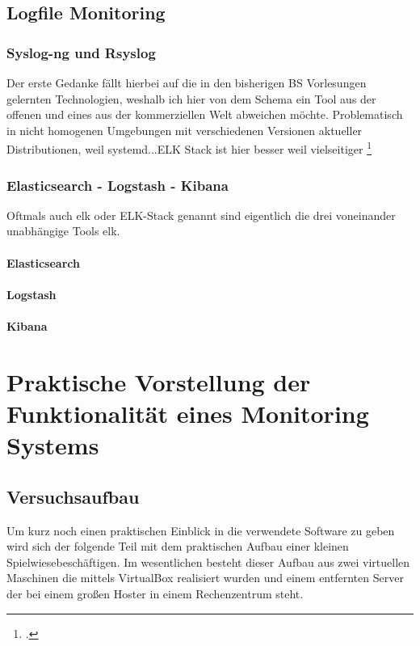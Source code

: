\documentclass[12pt,a4paper,parskip]{scrreprt}
\begin{document}
	\section{Logfile Monitoring}
	\subsection{Syslog-ng und Rsyslog}
	Der erste Gedanke fällt hierbei auf die in den bisherigen BS Vorlesungen gelernten Technologien, weshalb ich hier von dem Schema ein Tool aus der offenen und eines aus der kommerziellen Welt abweichen möchte.
	Problematisch in nicht homogenen Umgebungen mit verschiedenen Versionen aktueller Distributionen, weil systemd...ELK Stack ist hier besser weil vielseitiger
	\footcite{systemd2015}
	\subsection{Elasticsearch - Logstash - Kibana}
	Oftmals auch \acrshort{elk} oder ELK-Stack genannt sind eigentlich die drei voneinander unabhängige Tools \acrlong{elk}.
	\subsubsection{Elasticsearch}
	\subsubsection{Logstash}
	\subsubsection{Kibana}
	\chapter{Praktische Vorstellung der Funktionalität eines Monitoring Systems}
	\section{Versuchsaufbau}
	Um kurz noch einen praktischen Einblick in die verwendete Software zu geben wird sich der folgende Teil mit dem praktischen Aufbau einer kleinen \glqq Spielwiese\grqq beschäftigen. Im wesentlichen besteht dieser Aufbau aus zwei virtuellen Maschinen die mittels VirtualBox realisiert wurden und einem entfernten Server der bei einem großen Hoster in einem Rechenzentrum steht.
\end{document}
